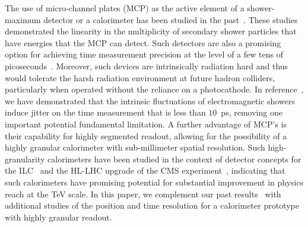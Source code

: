 The use of micro-channel plates (MCP) as the active element of a shower-maximum
detector or a calorimeter has been studied in the
past~\cite{Derevshchikov:1990ej,Albayrak-Yetkin:2013xga}. These studies
demonstrated the linearity in the multiplicity of secondary shower particles
that have energies that the MCP can detect. Such detectors are also a promising
option for achieving time measurement precision at the level of a few tens of
picoseconds~\cite{MCPFastCaloNIMA,Ronzhin:2015pba,Ronzhin2015288,Brianza2015216}.
Moreover, such devices are intrinsically radiation hard and thus would tolerate
the harsh radiation environment at future hadron colliders, particularly when
operated without the reliance on a photocathode. In
reference~\cite{Ronzhin2015288}, we have demonstrated that the intrinsic
fluctuations of electromagnetic showers induce jitter on the time measurement
that is less than $10$~ps, removing one important potential fundamental
limitation. A further advantage of MCP's is their capability for highly
segmented readout, allowing for the possibility of a highly granular calorimeter
with sub-millimeter spatial resolution. Such high-granularity calorimeters have
been studied in the context of detector concepts for the
ILC~\cite{Grondin:2010fe} and the HL-LHC upgrade of the CMS
experiment~\cite{Butler:2020886}, indicating that such calorimeters have
promising potential for substantial improvement in physics reach at the TeV
scale. In this paper, we complement our past
results~\cite{Anderson:2015gha,MCPFastCaloNIMA,Ronzhin:2015pba,Ronzhin2015288}
with additional studies of the position and time resolution for a calorimeter
prototype with highly granular readout.

